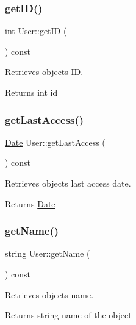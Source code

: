 \subsubsection{\texorpdfstring{get\+I\+D()}{getID()}}
{\footnotesize\ttfamily int User\+::get\+ID (\begin{DoxyParamCaption}{ }\end{DoxyParamCaption}) const}



Retrieves object\textquotesingle{}s ID. 

\begin{DoxyReturn}{Returns}
int id 
\end{DoxyReturn}
\mbox{\label{group___user_ga9399e8ad03d939281357fe2e1d2a0f71}} 
\subsubsection{\texorpdfstring{get\+Last\+Access()}{getLastAccess()}}
{\footnotesize\ttfamily \hyperlink{class_date}{Date} User\+::get\+Last\+Access (\begin{DoxyParamCaption}{ }\end{DoxyParamCaption}) const}



Retrieves object\textquotesingle{}s last access date. 

\begin{DoxyReturn}{Returns}
\hyperlink{class_date}{Date} 
\end{DoxyReturn}
\mbox{\label{group___user_gab9b2b5feb6bdd1582696eb6d44cee384}} 
\subsubsection{\texorpdfstring{get\+Name()}{getName()}}
{\footnotesize\ttfamily string User\+::get\+Name (\begin{DoxyParamCaption}{ }\end{DoxyParamCaption}) const}



Retrieves object\textquotesingle{}s name. 

\begin{DoxyReturn}{Returns}
string name of the object 
\end{DoxyReturn}
\mbox{\label{group___user_gadfbbdc7ea72e051b7b7b8d41c14eb846}} 
